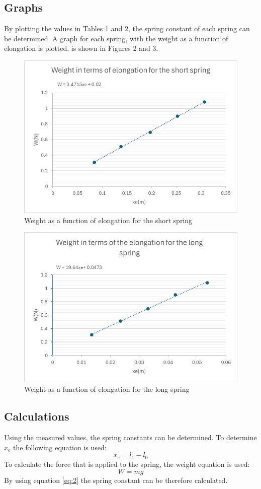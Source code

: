 \documentclass[a4paper, 10pt]{article}
\begin{document}
\begin{flushleft}
\subsection{Graphs}
By plotting the values in Tables 1 and 2, the spring constant of each spring can
be determined. A graph for each spring, with the weight as a function of elongation is plotted,
is shown in Figures 2 and 3.
\begin{figure}[!h]
    \centering
    \includegraphics[width = 0.7\linewidth]{constant_short_spring.png}
    \caption{Weight as a function of elongation for the short spring}
\end{figure}
\begin{figure}[!h]
    \centering
    \includegraphics[width = 0.7\linewidth]{constant_long_spring.png}
    \caption{Weight as a function of elongation for the long spring}
\end{figure}
\subsection{Calculations}
Using the measured values, the spring constants can be determined. To determine
$x_e$ the following equation is used:
\begin{equation}
    x_e = l_1 - l_0
\end{equation}
To calculate the force that is applied to the spring, the weight equation is
used:
\begin{equation}
    W = mg
\end{equation}
By using equation \ref{eq:2} the spring constant can be therefore calculated.

\end{flushleft}
\end{document}
